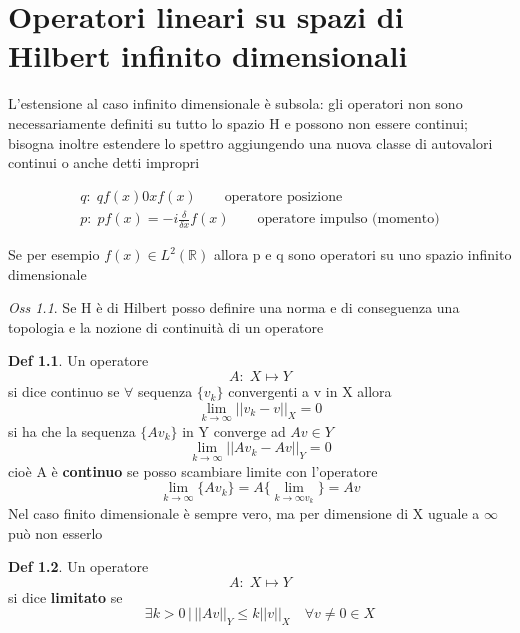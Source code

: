 \documentclass[a4paper,11pt]{report}
\theoremstyle{remark}
\newtheorem*{oss}{Oss}
\theoremstyle{definition}
\newtheorem*{Def}{Def}
\newcommand{\R}{\mathbb{R}}
\begin{document}
\chapter{Operatori lineari su spazi di Hilbert infinito dimensionali}

L'estensione al caso infinito dimensionale è subsola: gli operatori non sono necessariamente definiti su tutto lo spazio H e possono non essere continui; bisogna inoltre estendere lo spettro aggiungendo una nuova classe di autovalori continui o anche detti impropri

\begin{gather*}
	q: \; qf(x) 0 xf(x) \qquad \text{operatore posizione} \\
	p: \; pf(x) = -i\frac{\delta}{\delta x }f(x) \qquad \text{operatore impulso (momento)}
\end{gather*}

\noindent Se per esempio $f(x)\in L^2(\R)$ allora p e q sono operatori su uno spazio infinito dimensionale

\begin{oss}
	Se H è di Hilbert posso definire una norma e di conseguenza una topologia e la nozione di continuità di un operatore
\end{oss}

\begin{Def}
	Un operatore 
	\begin{equation*}
		A: \; X \mapsto Y
	\end{equation*}
	si dice continuo se $\forall$ sequenza $\{v_k\} $ convergenti a v in X allora
	\begin{equation*}
		\lim_{k\to\infty} {||v_k-v||}_X =0
	\end{equation*}
	si ha che la sequenza $\{Av_k\}$ in Y converge ad $Av \in Y$
	\begin{equation*}
		\lim_{k\to\infty} {||Av_k-Av||}_Y =0
	\end{equation*}
	cioè A è \textbf{continuo} se posso scambiare limite con l'operatore
	\begin{equation*}
		\lim_{k\to\infty} \{Av_k\} = A\{\lim_{k\to\infty v_k}\} = Av
	\end{equation*}
	Nel caso finito dimensionale è sempre vero, ma per dimensione di X uguale a $\infty$ può non esserlo 
\end{Def}

\begin{Def}
	Un operatore 
	\begin{equation*}
		A: \; X \mapsto Y
	\end{equation*}
	si dice \textbf{limitato} se 
	\begin{equation*}
		\exists k >0 \, | \, {||Av||}_Y \le k{||v||}_X \quad \forall v \ne 0 \in X
	\end{equation*}
\end{Def}
\end{document}
